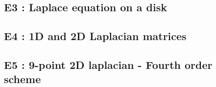 \subsection{E3 : Laplace equation on a disk}
\label{subsec:E3 : Laplace equation on a disk}


\subsection{E4 : 1D and 2D Laplacian matrices}
\label{subsec:E4 : 1D and 2D Laplacian matrices}


\subsection{E5 : 9-point 2D laplacian - Fourth order scheme }
\label{subsec:E5 : 9-point 2D laplacian - Fourth order scheme }

